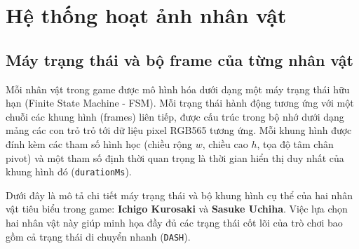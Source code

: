 \documentclass[a4paper,12pt]{report}
\begin{document}
\section{Hệ thống hoạt ảnh nhân vật}

\subsection{Máy trạng thái và bộ frame của từng nhân vật}

Mỗi nhân vật trong game được mô hình hóa dưới dạng một máy trạng thái hữu hạn (Finite State Machine - FSM). Mỗi trạng thái hành động tương ứng với một chuỗi các khung hình (frames) liên tiếp, được cấu trúc trong bộ nhớ dưới dạng mảng các con trỏ trỏ tới dữ liệu pixel RGB565 tương ứng. Mỗi khung hình được đính kèm các tham số hình học (chiều rộng $w$, chiều cao $h$, tọa độ tâm chân pivot) và một tham số định thời quan trọng là thời gian hiển thị duy nhất của khung hình đó (\texttt{durationMs}). 

Dưới đây là mô tả chi tiết máy trạng thái và bộ khung hình cụ thể của hai nhân vật tiêu biểu trong game: \textbf{Ichigo Kurosaki} và \textbf{Sasuke Uchiha}. Việc lựa chọn hai nhân vật này giúp minh họa đầy đủ các trạng thái cốt lõi của trò chơi bao gồm cả trạng thái di chuyển nhanh (\texttt{DASH}).
\end{document}
